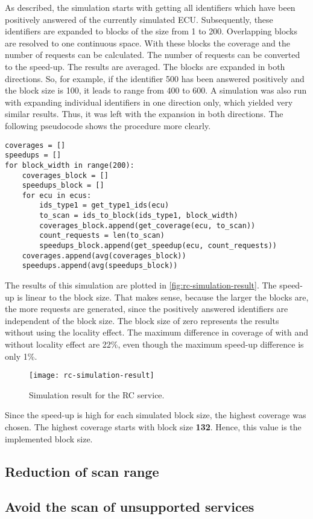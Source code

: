 As described, the simulation starts with getting all identifiers which have been positively answered of the currently simulated ECU. Subsequently, these identifiers are expanded to blocks of the size from 1 to 200. Overlapping blocks are resolved to one continuous space. With these blocks the coverage and the number of requests can be calculated. The number of requests can be converted to the speed-up. The results are averaged.
The blocks are expanded in both directions. So, for example, if the identifier 500 has been answered positively and the block size is 100, it leads to range from 400 to 600. A simulation was also run with expanding individual identifiers in one direction only, which yielded very similar results. Thus, it was left with the expansion in both directions. 
The following pseudocode shows the procedure more clearly.

\begin{samepage}
\begin{verbatim}
coverages = []
speedups = []
for block_width in range(200):
    coverages_block = []
    speedups_block = []
    for ecu in ecus:
        ids_type1 = get_type1_ids(ecu)
        to_scan = ids_to_block(ids_type1, block_width)
        coverages_block.append(get_coverage(ecu, to_scan))
        count_requests = len(to_scan)
        speedups_block.append(get_speedup(ecu, count_requests))
    coverages.append(avg(coverages_block))
    speedups.append(avg(speedups_block))
\end{verbatim}
\end{samepage}

The results of this simulation are plotted in \autoref{fig:rc-simulation-result}. The speed-up is linear to the block size. That makes sense, because the larger the blocks are, the more requests are generated, since the positively answered identifiers are independent of the block size. The block size of zero represents the results without using the locality effect. The maximum difference in coverage of with and without locality effect are 22\%, even though the maximum speed-up difference is only 1\%.

\begin{figure}[h]
    \centering
    \texttt{[image: rc-simulation-result]}
    \caption{Simulation result for the RC service.}
    \label{fig:rc-simulation-result}
\end{figure}

Since the speed-up is high for each simulated block size, the highest coverage was chosen. The highest coverage starts with block size \textbf{132}. Hence, this value is the implemented block size.


\subsection{Reduction of scan range}


\subsection{Avoid the scan of unsupported services}
